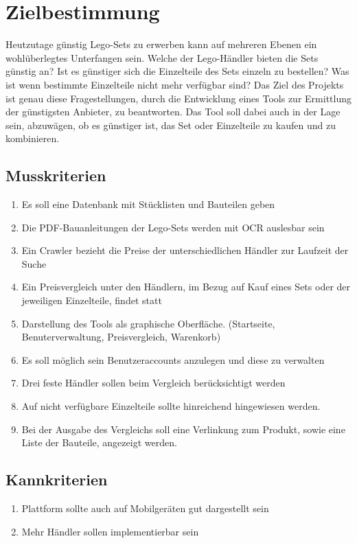 \newpage

\tableofcontents

\newpage

\section{Zielbestimmung}

Heutzutage günstig Lego-Sets zu erwerben kann auf mehreren Ebenen ein wohlüberlegtes Unterfangen sein. Welche der Lego-Händler bieten die Sets günstig an? Ist es günstiger sich die Einzelteile des Sets einzeln zu bestellen? Was ist wenn bestimmte Einzelteile nicht mehr verfügbar sind? \newline
Das Ziel des Projekts ist genau diese Fragestellungen, durch die Entwicklung eines Tools zur Ermittlung der günstigsten Anbieter, zu beantworten. Das Tool soll dabei auch in der Lage sein, abzuwägen, ob es günstiger ist, das Set oder Einzelteile zu kaufen und zu kombinieren.

\subsection{Musskriterien}
\begin{enumerate}
\item Es soll eine Datenbank mit Stücklisten und Bauteilen geben
\item Die PDF-Bauanleitungen der Lego-Sets werden mit OCR auslesbar sein
\item Ein Crawler bezieht die Preise der unterschiedlichen Händler zur Laufzeit der Suche
\item  Ein Preisvergleich unter den Händlern, im Bezug auf Kauf eines Sets oder der jeweiligen Einzelteile, findet statt
\item Darstellung des Tools als graphische Oberfläche. (Startseite, Benuterverwaltung, Preisvergleich, Warenkorb)
\item Es soll möglich sein Benutzeraccounts anzulegen und diese zu verwalten
\item Drei feste Händler sollen beim Vergleich berücksichtigt werden
\item Auf nicht verfügbare Einzelteile sollte hinreichend hingewiesen werden.
\item Bei der Ausgabe des Vergleichs soll eine Verlinkung zum Produkt, sowie eine Liste der Bauteile, angezeigt werden.
\end{enumerate}

\subsection{Kannkriterien}
\begin{enumerate}
\item Plattform sollte auch auf Mobilgeräten gut dargestellt sein
\item Mehr Händler sollen implementierbar sein
\end{enumerate}

